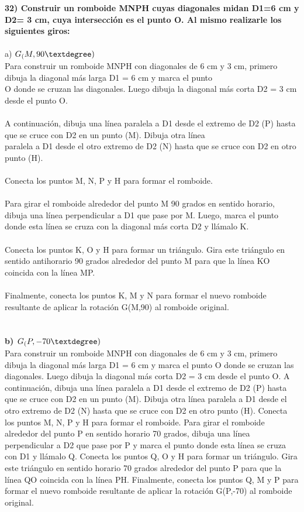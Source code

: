 \documentclass{article}
\begin{document}
{\bf 32) Construir un romboide MNPH cuyas diagonales midan D1=6 cm y D2= 3 cm, cuya intersección es el punto O. Al mismo realizarle los siguientes giros:} \\ \\ 
a) $G_(M,90\textdegree)$ \\
Para construir un romboide MNPH con diagonales de 6 cm y 3 cm, primero dibuja la diagonal más larga D1 = 6 cm y marca el punto\\
O donde se cruzan las diagonales. Luego dibuja la diagonal más corta D2 = 3 cm desde el punto O.\\
\\
A continuación, dibuja una línea paralela a D1 desde el extremo de D2 (P) hasta que se cruce con D2 en un punto (M). Dibuja otra línea\\
paralela a D1 desde el otro extremo de D2 (N) hasta que se cruce con D2 en otro punto (H).\\
\\
Conecta los puntos M, N, P y H para formar el romboide.\\
\\
Para girar el romboide alrededor del punto M 90 grados en sentido horario, dibuja una línea perpendicular a D1 que pase por M. Luego, marca el punto donde esta línea se cruza con la diagonal más corta D2 y llámalo K.\\
\\
Conecta los puntos K, O y H para formar un triángulo. Gira este triángulo en sentido antihorario 90 grados alrededor del punto M para que la línea KO coincida con la línea MP.\\
\\
Finalmente, conecta los puntos K, M y N para formar el nuevo romboide resultante de aplicar la rotación G(M,90) al romboide original.\\
\\
\\
{\bf b) $G_(P,-70\textdegree)$ } \\
 Para construir un romboide MNPH con diagonales de 6 cm y 3 cm, primero dibuja la diagonal más larga D1 = 6 cm y marca el punto
O donde se cruzan las diagonales. Luego dibuja la diagonal más corta D2 = 3 cm desde el punto O.   A continuación, dibuja una línea paralela a D1 desde el extremo de D2 (P) hasta que se cruce con D2 en un punto (M). Dibuja otra línea paralela a D1 desde el otro extremo de D2 (N) hasta que se cruce con D2 en otro punto (H).   Conecta los puntos M, N, P y H para formar el romboide.   Para girar el romboide alrededor del punto P en sentido horario 70 grados, dibuja una línea perpendicular a D2 que pase por P y marca el punto donde esta línea se cruza con D1 y llámalo Q.   Conecta los puntos Q, O y H para formar un triángulo. Gira este triángulo en sentido horario 70 grados alrededor del punto P para que la línea QO coincida con la línea PH.   Finalmente, conecta los puntos Q, M y P para formar el nuevo romboide resultante de aplicar la rotación G(P,-70) al romboide original.
\end{document}
